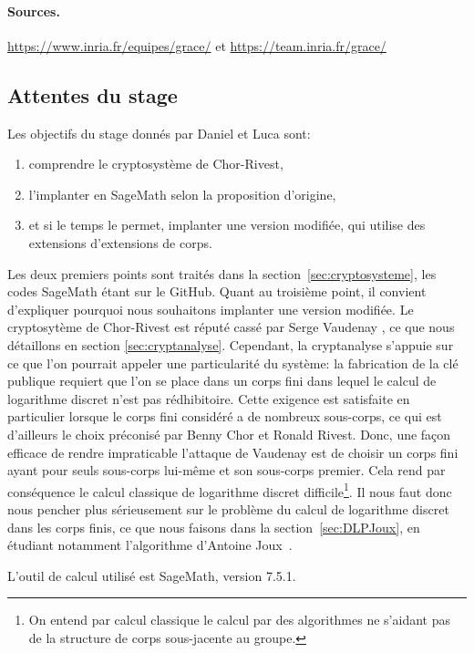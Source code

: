 \documentclass[a4paper, titlepage, 11pt]{article}
\theoremstyle{definition}
\theoremstyle{remark}
\begin{document}
\paragraph{Sources.} \url{https://www.inria.fr/equipes/grace/} et \url{https://team.inria.fr/grace/}

\subsection{Attentes du stage}

Les objectifs du stage donnés par Daniel et Luca sont:\begin{enumerate}
\item comprendre le cryptosystème de Chor-Rivest,
\item l'implanter en SageMath selon la proposition d'origine,
\item et si le temps le permet, implanter une version modifiée, qui utilise des extensions d'extensions de corps.
\end{enumerate}
Les deux premiers points sont traités dans la section~\ref{sec:cryptosysteme}, les codes SageMath étant sur le {GitHub}. Quant au troisième point, il convient d'expliquer pourquoi nous souhaitons implanter une version modifiée. Le cryptosytème de Chor-Rivest \cite{chorRivest1988} est réputé \og{}cassé \fg{} par Serge Vaudenay \cite{vaudenay2000}, ce que nous détaillons en section \ref{sec:cryptanalyse}. Cependant, la cryptanalyse s’appuie sur ce que l'on pourrait appeler une particularité du système: la fabrication de la clé publique requiert que l'on se place dans un corps fini dans lequel le calcul de logarithme discret n'est pas rédhibitoire. Cette exigence est satisfaite en particulier lorsque le corps fini considéré a de nombreux sous-corps, ce qui est d'ailleurs le choix préconisé par Benny Chor et Ronald Rivest. Donc, une façon efficace de rendre impraticable l'attaque de Vaudenay est de choisir un corps fini ayant pour seuls sous-corps lui-même et son sous-corps premier. Cela rend par conséquence le calcul classique de logarithme discret difficile\footnote{On entend par \og{}calcul classique\fg{} le calcul par des algorithmes ne s'aidant pas de la structure de corps sous-jacente au groupe.}. Il nous faut donc nous pencher plus sérieusement sur le problème du calcul de logarithme discret dans les corps finis, ce que nous faisons dans la section~\ref{sec:DLPJoux}, en étudiant notamment l'algorithme d'Antoine Joux~\cite{joux2013}.

L'outil de calcul utilisé est SageMath, version 7.5.1.
\end{document}
